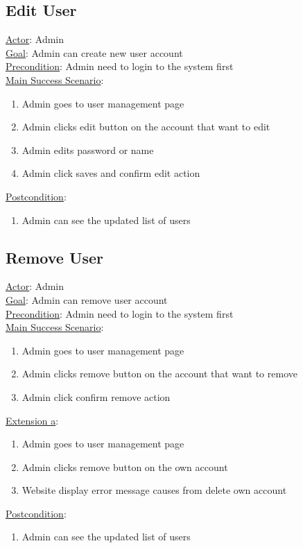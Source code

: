 \documentclass[12pt,oneside,openright,a4paper]{cpe-english-project}
\begin{document}
\subsection{Edit User}
\underline{Actor}: Admin\\
\underline{Goal}: Admin can create new user account\\
\underline{Precondition}: Admin need to login to the system first\\
\underline{Main Success Scenario}:
\begin{enumerate}[label={\arabic*.}]
	\item Admin goes to user management page
	\item Admin clicks edit button on the account that want to edit
	\item Admin edits password or name
	\item Admin click saves and confirm edit action
\end{enumerate}
\underline{Postcondition}: 
\begin{enumerate}[label={\arabic*.}]
	\item Admin can see the updated list of users
\end{enumerate}

\subsection{Remove User}
\underline{Actor}: Admin\\
\underline{Goal}: Admin can remove user account\\
\underline{Precondition}: Admin need to login to the system first\\
\underline{Main Success Scenario}:
\begin{enumerate}[label={\arabic*.}]
	\item Admin goes to user management page
	\item Admin clicks remove button on the account that want to remove
	\item Admin click confirm remove action
\end{enumerate}
\underline{Extension a}:
\begin{enumerate}[label={\arabic*.}]
	\item Admin goes to user management page
	\item Admin clicks remove button on the own account
	\item Website display error message causes from delete own account
\end{enumerate}
\underline{Postcondition}: 
\begin{enumerate}[label={\arabic*.}]
	\item Admin can see the updated list of users
\end{enumerate}
\end{document}
